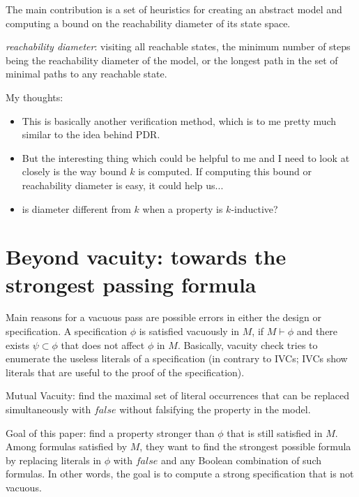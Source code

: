 The  main contribution is  a  set  of  heuristics  for  creating  an
abstract model and computing a bound on the reachability
diameter of its state space.

\emph{reachability diameter}: visiting all
reachable states, the minimum number of steps being the
reachability diameter
of the
model, or the longest path in the set of minimal paths to any reachable state.


\linebreak
\linebreak
My thoughts:
\begin{itemize}
  \item This is basically another verification method, which is to me pretty much similar to the idea behind PDR.
  \item But the interesting thing which could be helpful to me and I need to look at closely is
  the way bound $k$ is computed. If computing this bound or reachability diameter is easy, it could help us...
  \item is diameter different from $k$ when a property is $k$-inductive?

\end{itemize}


\section{Beyond vacuity: towards the strongest passing formula \cite{chockler2013beyond}}
Main reasons for a vacuous pass are possible errors in either the design or specification.
A specification $\phi$ is satisfied vacuously in $M$, if $M \vdash \phi$ and
there exists $\psi \subset \phi$ that does not affect $\phi$ in $M$.
Basically, vacuity check tries to
enumerate the useless literals of a specification (in contrary to IVCs;
IVCs show literals that are useful to the proof of the specification).

Mutual Vacuity: find the maximal set of literal occurrences that can be
replaced simultaneously with $false$ without falsifying the property in the model.

Goal of this paper: find a property stronger than $\phi$ that is still satisfied in $M$.
Among formulas satisfied by $M$, they want to find the strongest possible formula by
replacing literals in $\phi$ with $false$ and any Boolean combination of such formulas.
In other words, the goal is to compute a strong specification that is not vacuous.


